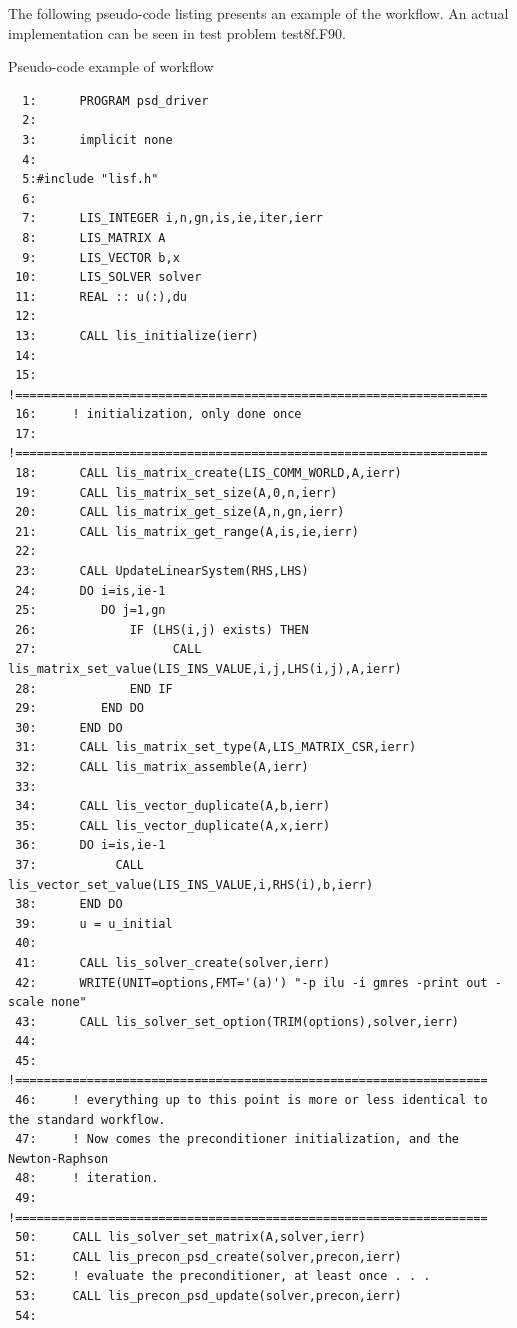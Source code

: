 \documentclass[a4paper]{article}
\begin{document}
\vspace{1pc}

The following pseudo-code listing presents an example of the workflow.
An actual implementation can be seen in test problem test8f.F90.

\vspace{1pc}

\begin{itembox}[l]{Pseudo-code example of workflow}
{\small
\begin{verbatim}
  1:      PROGRAM psd_driver
  2:
  3:      implicit none
  4:      
  5:#include "lisf.h"
  6:
  7:      LIS_INTEGER i,n,gn,is,ie,iter,ierr
  8:      LIS_MATRIX A
  9:      LIS_VECTOR b,x
 10:      LIS_SOLVER solver
 11:      REAL :: u(:),du
 12:
 13:      CALL lis_initialize(ierr)
 14:
 15:     !==================================================================
 16:     ! initialization, only done once
 17:     !==================================================================
 18:      CALL lis_matrix_create(LIS_COMM_WORLD,A,ierr)
 19:      CALL lis_matrix_set_size(A,0,n,ierr)
 20:      CALL lis_matrix_get_size(A,n,gn,ierr)
 21:      CALL lis_matrix_get_range(A,is,ie,ierr)
 22:
 23:      CALL UpdateLinearSystem(RHS,LHS)
 24:      DO i=is,ie-1
 25:         DO j=1,gn
 26:             IF (LHS(i,j) exists) THEN
 27:                   CALL lis_matrix_set_value(LIS_INS_VALUE,i,j,LHS(i,j),A,ierr)
 28:             END IF
 29:         END DO
 30:      END DO
 31:      CALL lis_matrix_set_type(A,LIS_MATRIX_CSR,ierr)
 32:      CALL lis_matrix_assemble(A,ierr)
 33:
 34:      CALL lis_vector_duplicate(A,b,ierr)
 35:      CALL lis_vector_duplicate(A,x,ierr)
 36:      DO i=is,ie-1
 37:           CALL lis_vector_set_value(LIS_INS_VALUE,i,RHS(i),b,ierr)
 38:      END DO
 39:      u = u_initial
 40:
 41:      CALL lis_solver_create(solver,ierr)
 42:      WRITE(UNIT=options,FMT='(a)') "-p ilu -i gmres -print out -scale none"
 43:      CALL lis_solver_set_option(TRIM(options),solver,ierr)
 44:
 45:     !==================================================================
 46:     ! everything up to this point is more or less identical to the standard workflow.
 47:     ! Now comes the preconditioner initialization, and the Newton-Raphson
 48:     ! iteration.
 49:     !==================================================================
 50:     CALL lis_solver_set_matrix(A,solver,ierr)
 51:     CALL lis_precon_psd_create(solver,precon,ierr)
 52:     ! evaluate the preconditioner, at least once . . .
 53:     CALL lis_precon_psd_update(solver,precon,ierr)
 54:
\end{verbatim}
}
\end{itembox}
\end{document}
